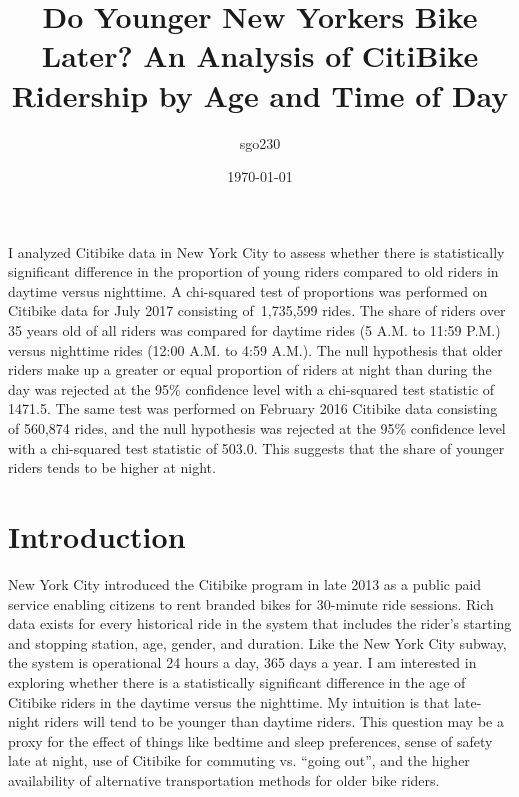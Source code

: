 \documentclass[10pt]{article}
\renewenvironment{abstract}
  {{\bfseries\noindent{\abstractname}\par\nobreak}\footnotesize}
  {\bigskip}
\begin{document}
\title{Do Younger New Yorkers Bike Later? An Analysis of CitiBike Ridership by
Age and Time of Day}



\author[1]{sgo230}%
%


\vspace{-1em}



  \date{\today}


\begingroup
\let\center\flushleft
\let\endcenter\endflushleft
\maketitle
\endgroup





\begin{abstract}
I analyzed Citibike data in New York City to assess whether there is
statistically significant difference in the proportion of young riders
compared to old riders in daytime versus nighttime. A chi-squared test
of proportions was performed on Citibike data for July 2017 consisting
of~1,735,599 rides. The share of riders over 35 years old of all riders
was compared for daytime rides (5 A.M. to 11:59 P.M.) versus nighttime
rides (12:00 A.M. to 4:59 A.M.). The null hypothesis that older riders
make up a greater or equal proportion of riders at night than during the
day was rejected at the 95\% confidence level with a chi-squared test
statistic of 1471.5. The same test was performed on February 2016
Citibike data consisting of 560,874 rides, and the null hypothesis was
rejected at the 95\% confidence level with a chi-squared test statistic
of 503.0. This suggests that the share of younger riders tends to be
higher at night.%
\end{abstract}%



\section*{Introduction}

{\label{874460}}

New York City introduced the Citibike program in late 2013 as a public
paid service enabling citizens to rent branded bikes for 30-minute ride
sessions. Rich data exists for every historical ride in the system that
includes the rider's starting and stopping station, age, gender, and
duration. Like the New York City subway, the system is operational 24
hours a day, 365 days a year. I am interested in exploring whether there
is a statistically significant difference in the age of Citibike riders
in the daytime versus the nighttime. My intuition is that late-night
riders will tend to be younger than daytime riders. This question may be
a proxy for the effect of things like bedtime and sleep preferences,
sense of safety late at night, use of Citibike for commuting vs. ``going
out'', and the higher availability of alternative transportation methods
for older bike riders.
\end{document}
